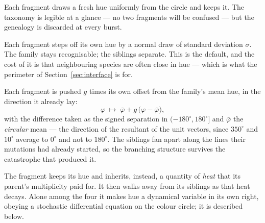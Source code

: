 \documentclass[11pt,a4paper]{article}
\begin{document}
\begin{description}[itemsep=4pt,leftmargin=1.4em]
\item[Redraw.] Each fragment draws a fresh hue uniformly from the circle and keeps it.
  The taxonomy is legible at a glance --- no two fragments will be confused --- but the
  genealogy is discarded at every burst.

\item[Jitter.] Each fragment steps off its own hue by a normal draw of standard deviation
  $\sigma$. The family stays recognisable; the siblings separate. This is the default, and
  the cost of it is that neighbouring species are often close in hue --- which is what the
  perimeter of Section~\ref{sec:interface} is for.

\item[Spread.] Each fragment is pushed $g$ times its own offset from the family's mean
  hue, in the direction it already lay:
  \begin{equation}
    \varphi \;\mapsto\; \bar\varphi + g\,\bigl(\varphi - \bar\varphi\bigr),
  \end{equation}
  with the difference taken as the signed separation in $(-180^{\circ}, 180^{\circ}]$ and
  $\bar\varphi$ the \emph{circular} mean --- the direction of the resultant of the unit
  vectors, since $350^{\circ}$ and $10^{\circ}$ average to $0^{\circ}$ and not to
  $180^{\circ}$. The siblings fan apart along the lines their mutations had already
  started, so the branching structure survives the catastrophe that produced it.

\item[Thermostat.] The fragment keeps its hue and inherits, instead, a quantity of
  \emph{heat} that its parent's multiplicity paid for. It then walks away from its
  siblings as that heat decays. Alone among the four it makes hue a dynamical variable in
  its own right, obeying a stochastic differential equation on the colour circle; it is
  described below.
\end{description}
\end{document}
